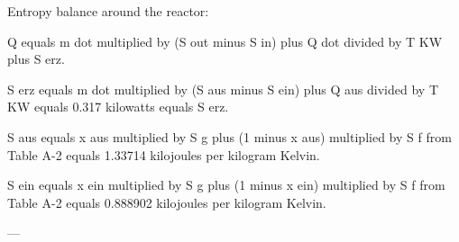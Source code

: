 Entropy balance around the reactor:  

Q equals m dot multiplied by (S out minus S in) plus Q dot divided by T KW plus S erz.  

S erz equals m dot multiplied by (S aus minus S ein) plus Q aus divided by T KW equals 0.317 kilowatts equals S erz.  

S aus equals x aus multiplied by S g plus (1 minus x aus) multiplied by S f from Table A-2 equals 1.33714 kilojoules per kilogram Kelvin.  

S ein equals x ein multiplied by S g plus (1 minus x ein) multiplied by S f from Table A-2 equals 0.888902 kilojoules per kilogram Kelvin.  

---